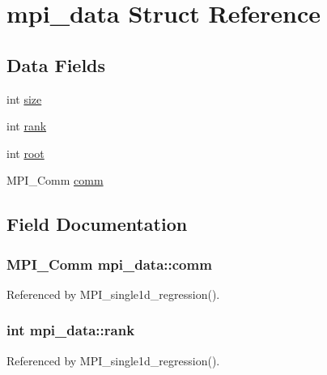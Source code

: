\hypertarget{structmpi__data}{}\section{mpi\+\_\+data Struct Reference}
\label{structmpi__data}
\subsection*{Data Fields}
\begin{DoxyCompactItemize}
\item 
int \hyperlink{structmpi__data_a454bff7b727bb81687b01da221a284ab}{size}
\item 
int \hyperlink{structmpi__data_ac5f1fb6053c79ad2cf41b9e4ab4836dd}{rank}
\item 
int \hyperlink{structmpi__data_a9154a09cb4cd23dcbd2eb96adf434756}{root}
\item 
M\+P\+I\+\_\+\+Comm \hyperlink{structmpi__data_a65d9b0b2095c5d72c65bc17ca72b2f5f}{comm}
\end{DoxyCompactItemize}


\subsection{Field Documentation}
\subsubsection[{\texorpdfstring{comm}{comm}}]{\setlength{\rightskip}{0pt plus 5cm}M\+P\+I\+\_\+\+Comm mpi\+\_\+data\+::comm}\hypertarget{structmpi__data_a65d9b0b2095c5d72c65bc17ca72b2f5f}{}\label{structmpi__data_a65d9b0b2095c5d72c65bc17ca72b2f5f}


Referenced by M\+P\+I\+\_\+single1d\+\_\+regression().

\subsubsection[{\texorpdfstring{rank}{rank}}]{\setlength{\rightskip}{0pt plus 5cm}int mpi\+\_\+data\+::rank}\hypertarget{structmpi__data_ac5f1fb6053c79ad2cf41b9e4ab4836dd}{}\label{structmpi__data_ac5f1fb6053c79ad2cf41b9e4ab4836dd}


Referenced by M\+P\+I\+\_\+single1d\+\_\+regression().

